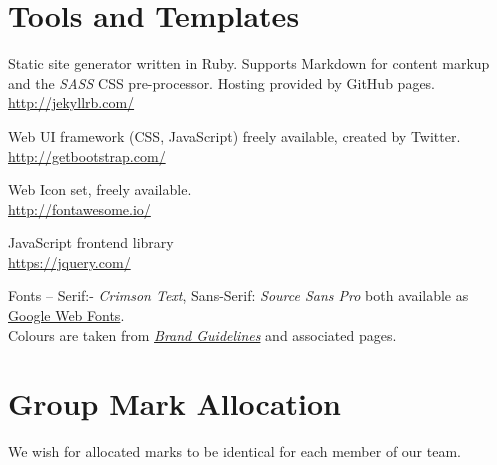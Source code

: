 \documentclass[a4paper, notoc]{tufte-handout}
\let\origdescription\description
\renewenvironment{description}{
  \setlength{\leftmargini}{1.5em}
  \origdescription
  \setlength{\itemindent}{-1.5em}
  \setlength{\labelsep}{\textwidth}
}
{\endlist}
\begin{document}
\section{Tools and Templates}


\begin{description}

\item[Jekyll]
Static site generator written in Ruby. Supports Markdown for 
content markup and the \textit{SASS} CSS pre-processor.
Hosting provided by GitHub pages.
\\
\href{http://jekyllrb.com/}{http://jekyllrb.com/}

\item[BootStrap]
Web UI framework (CSS, JavaScript) freely available, created by Twitter.
\\
\href{http://getbootstrap.com/}{http://getbootstrap.com/}

\item[FontAwesome]
Web Icon set, freely available.
\\
\href{http://fontawesome.io/}{http://fontawesome.io/}


\item[JQuery]
JavaScript frontend library
\\
\href{https://jquery.com/}{https://jquery.com/}

\item[University of Edinburgh Style Guide]
Fonts -- Serif:- \textit{Crimson Text}, Sans-Serif: \textit{Source Sans Pro} both 
available as \href{https://fonts.google.com/}{Google Web Fonts}.
\\
Colours are taken from 
\href{http://www.ed.ac.uk/communications-marketing/resources}{\textit{Brand Guidelines}} 
and associated pages.
\\



\end{description}




\section*{Group Mark Allocation}\label{group-mark-allocation}


We wish for allocated marks to be identical for each member of our team.
\end{document}
